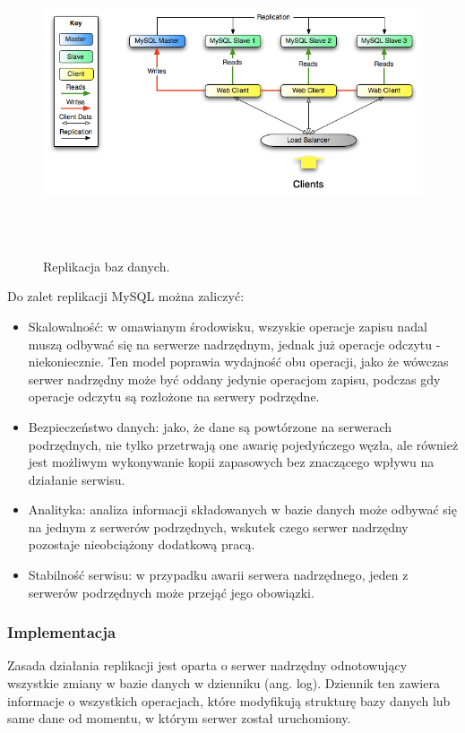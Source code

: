 \documentclass[11pt,a4paper,twoside]{article}
\begin{document}
\begin{figure}[ht]
\caption{Replikacja baz danych.}
\label{replikacja}
\centering
\includegraphics[height=9cm, width=15.7cm]{replikacja}
\end{figure}

Do zalet replikacji MySQL można zaliczyć:
\begin{itemize}
\item Skalowalność: w omawianym środowisku, wszyskie operacje zapisu nadal muszą odbywać się na serwerze nadrzędnym, jednak już operacje odczytu - niekoniecznie. Ten model poprawia wydajność obu operacji, jako że wówczas serwer nadrzędny może być oddany jedynie operacjom zapisu, podczas gdy operacje odczytu są rozłożone na serwery podrzędne.
\item Bezpieczeństwo danych: jako, że dane są powtórzone na serwerach podrzędnych, nie tylko przetrwają one awarię pojedyńczego węzła, ale również jest możliwym wykonywanie kopii zapasowych bez znaczącego wpływu na działanie serwisu.
\item Analityka: analiza informacji składowanych w bazie danych może odbywać się na jednym z serwerów podrzędnych, wskutek czego serwer nadrzędny pozostaje nieobciążony dodatkową pracą.
\item Stabilność serwisu: w przypadku awarii serwera nadrzędnego, jeden z serwerów podrzędnych może przejąć jego obowiązki.
\end{itemize}

\subsubsection{Implementacja}
Zasada działania replikacji jest oparta o serwer nadrzędny odnotowujący wszystkie zmiany w bazie danych w dzienniku (ang. log). Dziennik ten zawiera informacje o wszystkich operacjach, które modyfikują strukturę bazy danych lub same dane od momentu, w którym serwer został uruchomiony.
\end{document}
